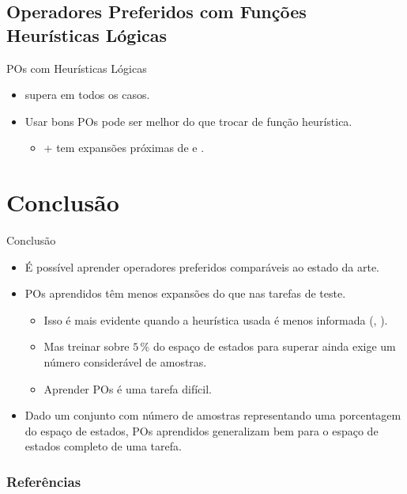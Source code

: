 \documentclass{beamer}
\begin{document}
\subsection{Operadores Preferidos com Funções Heurísticas Lógicas}
\begin{frame}{POs com Heurísticas Lógicas}

\begin{itemize}
  \item \pog \alert{supera} \poff em todos os casos.
  \pause
  \item Usar bons POs pode ser \alert{melhor} do que trocar de função heurística.
    \begin{itemize}
       \item \hgc + \pog tem expansões próximas de \hff e \hadd.
    \end{itemize}
\end{itemize}
\end{frame}


\section{Conclusão}
\begin{frame}{Conclusão}
\begin{itemize}
  \item É possível aprender operadores preferidos \alert{comparáveis ao estado da arte}.
  \pause
  \item POs aprendidos \pog têm \alert{menos expansões} do que \poff nas tarefas de teste.
  \pause
    \begin{itemize}
      \item Isso é mais evidente quando a heurística usada é menos informada (\hgc, \hblind).
      \pause
      \item Mas treinar sobre $5\,\%$ do espaço de estados para superar \poff ainda exige um número considerável de amostras.
      \pause
      \item Aprender POs é uma tarefa \alert{difícil}.
    \end{itemize}
  \pause
  \item Dado um conjunto com número de amostras representando uma porcentagem do espaço de estados, POs aprendidos \alert{generalizam bem} para o espaço de estados completo de uma tarefa.
\end{itemize}
\end{frame}

\begin{frame}[allowframebreaks]
\frametitle{Referências}
\printbibliography
\end{frame}
\end{document}
